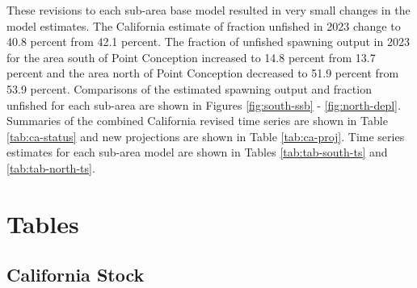 \documentclass[
  letterpaper,
]{article}
\begin{document}
These revisions to each sub-area base model resulted in very small changes in the model estimates. The California estimate of fraction unfished in 2023 change to 40.8 percent from 42.1 percent. The fraction of unfished spawning output in 2023 for the area south of Point Conception increased to 14.8 percent from 13.7 percent and the area north of Point Conception decreased to 51.9 percent from 53.9 percent. Comparisons of the estimated spawning output and fraction unfished for each sub-area are shown in Figures \ref{fig:south-ssb} - \ref{fig:north-depl}. Summaries of the combined California revised time series are shown in Table \ref{tab:ca-status} and new projections are shown in Table \ref{tab:ca-proj}. Time series estimates for each sub-area model are shown in Tables \ref{tab:tab-south-ts} and \ref{tab:tab-north-ts}.

\pagebreak

\hypertarget{tables}{%
\section{Tables}\label{tables}}

\hypertarget{california-stock}{%
\subsection{California Stock}\label{california-stock}}

\begingroup\fontsize{10}{12}\selectfont
\begingroup\fontsize{10}{12}\selectfont
\end{document}
